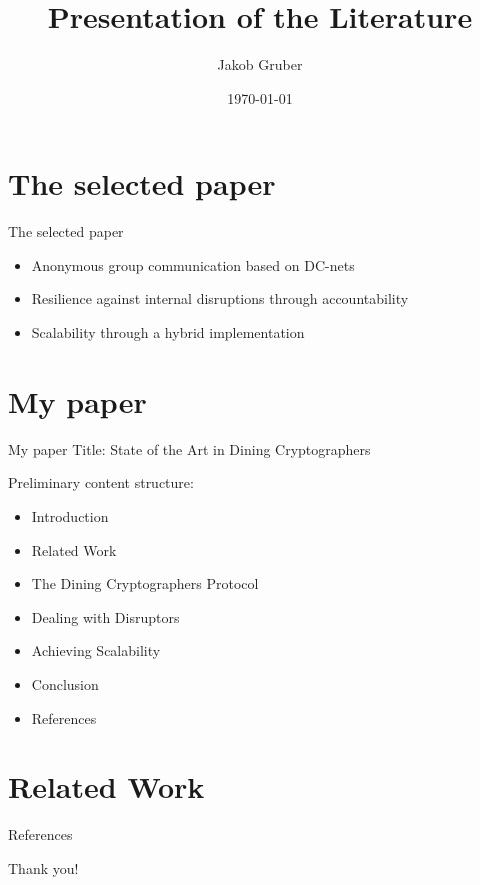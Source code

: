 \documentclass[]{beamer} %
\title{Presentation of the Literature}
\author{Jakob Gruber}
\date{\today}
\begin{document}
\maketitle

\section{The selected paper}

\begin{frame}{The selected paper}
    
    \begin{itemize}
        \item Anonymous group communication based on DC-nets
        \item Resilience against internal disruptions through accountability
        \item Scalability through a hybrid implementation
    \end{itemize}
\end{frame}

\section{My paper}

\begin{frame}{My paper}
    Title: State of the Art in Dining Cryptographers
    
    Preliminary content structure:
    \begin{itemize}
        \item Introduction
        \item Related Work
        \item The Dining Cryptographers Protocol
        \item Dealing with Disruptors
        \item Achieving Scalability
        \item Conclusion
        \item [] References
    \end{itemize}
\end{frame}

\section{Related Work}

\begin{frame}[allowframebreaks]{References}
    \nocite{journals/joc/Chaum88}
    \nocite{conf/eurocrypt/GolleJ04}
    \nocite{journals/corr/abs-1004-3057}
    \nocite{journals/cacm/Chaum81}
    \nocite{goel2003herbivore}
    \nocite{conf/uss/DingledineMS04}
    \nocite{von2003k}
    \nocite{ElGamal1985}
    \nocite{conf/ccs/Neff01}
    \nocite{danezis2008survey}
    \printbibliography
\end{frame}

\begin{titleframe}
    \begin{center}
    \alert{\Large Thank you!}
    \end{center}
\end{titleframe}
\end{document}
